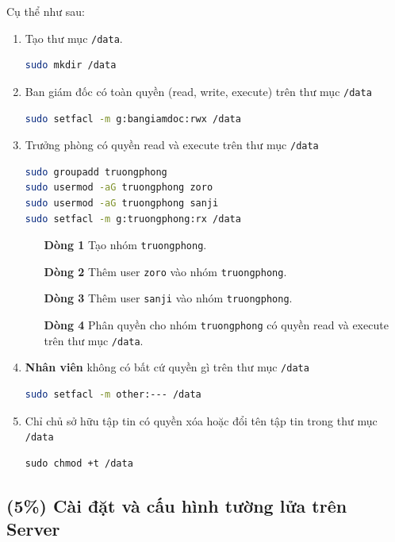 \documentclass[a4paper, 11pt]{article}
\begin{document}
Cụ thể như sau:
\begin{enumerate}
    \item Tạo thư mục \texttt{/data}.
          \begin{lstlisting}[language=bash, caption=Tạo thư mục \texttt{/data}]
sudo mkdir /data
\end{lstlisting}
    \item Ban giám đốc có toàn quyền (read, write, execute) trên thư mục \texttt{/data}
          \begin{lstlisting}[language=bash, caption=Phân quyền cho ban giám đốc]
sudo setfacl -m g:bangiamdoc:rwx /data
\end{lstlisting}
    \item  Trưởng phòng có quyền read và execute trên thư mục \texttt{/data}
          \begin{lstlisting}[language=bash, caption=Phân quyền cho trưởng phòng]
sudo groupadd truongphong
sudo usermod -aG truongphong zoro
sudo usermod -aG truongphong sanji
sudo setfacl -m g:truongphong:rx /data
\end{lstlisting}

          \begin{itemize}
              \item [\textbf{Dòng 1}] Tạo nhóm \texttt{truongphong}.
              \item [\textbf{Dòng 2}] Thêm user \texttt{zoro} vào nhóm \texttt{truongphong}.
              \item [\textbf{Dòng 3}] Thêm user \texttt{sanji} vào nhóm \texttt{truongphong}.
              \item [\textbf{Dòng 4}] Phân quyền cho nhóm \texttt{truongphong} có quyền read và execute trên thư mục \texttt{/data}.
          \end{itemize}
    \item \textbf{Nhân viên} không có bất cứ quyền gì trên thư mục \texttt{/data}
          \begin{lstlisting}[language=bash, caption=Phân quyền cho nhân viên]
sudo setfacl -m other:--- /data
\end{lstlisting}
    \item Chỉ chủ sở hữu tập tin có quyền xóa hoặc đổi tên tập tin trong thư mục \texttt{/data}
          \begin{lstlisting}
sudo chmod +t /data
\end{lstlisting}
\end{enumerate}

\subsection{(5\%) Cài đặt và cấu hình tường lửa trên Server}
\end{document}
